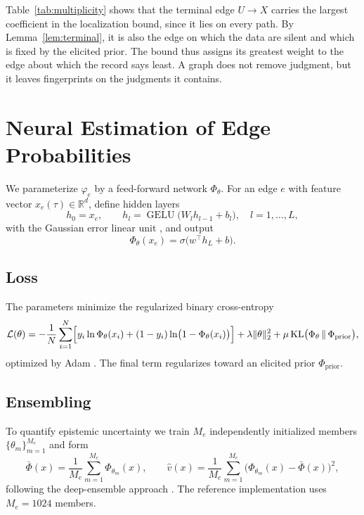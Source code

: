 \documentclass[11pt]{article}
\theoremstyle{remark}
\DeclareMathOperator{\GELU}{GELU}
\newcommand{\R}{\mathbb{R}}
\begin{document}
Table~\ref{tab:multiplicity} shows that the terminal edge $U\to X$ carries the largest coefficient in the localization bound, since it lies on every path. By Lemma~\ref{lem:terminal}, it is also the edge on which the data are silent and which is fixed by the elicited prior. The bound thus assigns its greatest weight to the edge about which the record says least. A graph does not remove judgment, but it leaves fingerprints on the judgments it contains.


\section{Neural Estimation of Edge Probabilities}\label{sec:neural}

We parameterize $\varphi_e$ by a feed-forward network $\Phi_\theta$. For an edge $e$ with feature vector $x_e(\tau)\in\R^{d}$, define hidden layers
\begin{equation}
h_0=x_e,\qquad h_{l}=\GELU\!\bigl(W_l h_{l-1}+b_l\bigr),\quad l=1,\dots,L,
\end{equation}
with the Gaussian error linear unit \cite{hendrycks2016}, and output
\begin{equation}
\Phi_\theta(x_e)=\sigma\!\bigl(w^{\top}h_L+b\bigr).
\end{equation}

\subsection{Loss}

The parameters minimize the regularized binary cross-entropy
\begin{equation}\label{eq:loss}
\mathcal{L}(\theta)=-\frac{1}{N}\sum_{i=1}^{N}\Bigl[y_i\ln\Phi_\theta(x_i)+(1-y_i)\ln\bigl(1-\Phi_\theta(x_i)\bigr)\Bigr]+\lambda\|\theta\|_2^2+\mu\,\mathrm{KL}\bigl(\Phi_\theta\,\|\,\Phi_{\mathrm{prior}}\bigr),
\end{equation}
optimized by Adam \cite{kingma2015}. The final term regularizes toward an elicited prior $\Phi_{\mathrm{prior}}$.

\subsection{Ensembling}

To quantify epistemic uncertainty we train $M_e$ independently initialized members $\{\theta_m\}_{m=1}^{M_e}$ and form
\begin{equation}
\bar\Phi(x)=\frac1{M_e}\sum_{m=1}^{M_e}\Phi_{\theta_m}(x),\qquad
\widehat{v}(x)=\frac1{M_e}\sum_{m=1}^{M_e}\bigl(\Phi_{\theta_m}(x)-\bar\Phi(x)\bigr)^2,
\end{equation}
following the deep-ensemble approach \cite{lakshminarayanan2017}. The reference implementation uses $M_e=1024$ members.
\end{document}
